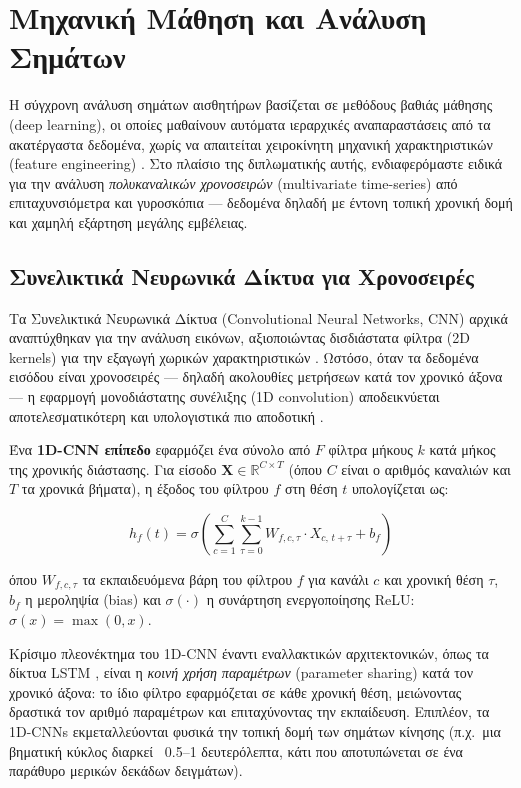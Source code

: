 
\section{Μηχανική Μάθηση και Ανάλυση Σημάτων}
\label{sec:ml_signals}

Η σύγχρονη ανάλυση σημάτων αισθητήρων βασίζεται σε μεθόδους βαθιάς μάθησης
(deep learning), οι οποίες μαθαίνουν αυτόματα ιεραρχικές αναπαραστάσεις
από τα ακατέργαστα δεδομένα, χωρίς να απαιτείται χειροκίνητη μηχανική
χαρακτηριστικών (feature engineering) \cite{Goodfellow2016}. Στο πλαίσιο
της διπλωματικής αυτής, ενδιαφερόμαστε ειδικά για την ανάλυση
\textit{πολυκαναλικών χρονοσειρών} (multivariate time-series) από
επιταχυνσιόμετρα και γυροσκόπια — δεδομένα δηλαδή με έντονη τοπική
χρονική δομή και χαμηλή εξάρτηση μεγάλης εμβέλειας.

\subsection{Συνελικτικά Νευρωνικά Δίκτυα για Χρονοσειρές}
\label{subsec:cnn_timeseries}

Τα Συνελικτικά Νευρωνικά Δίκτυα (Convolutional Neural Networks, CNN)
αρχικά αναπτύχθηκαν για την ανάλυση εικόνων, αξιοποιώντας δισδιάστατα
φίλτρα (2D kernels) για την εξαγωγή χωρικών χαρακτηριστικών \cite{He2016}.
Ωστόσο, όταν τα δεδομένα εισόδου είναι χρονοσειρές — δηλαδή ακολουθίες
μετρήσεων κατά τον χρονικό άξονα — η εφαρμογή μονοδιάστατης συνέλιξης
(1D convolution) αποδεικνύεται αποτελεσματικότερη και υπολογιστικά πιο
αποδοτική \cite{Chen2021}.

Ένα \textbf{1D-CNN επίπεδο} εφαρμόζει ένα σύνολο από $F$ φίλτρα μήκους
$k$ κατά μήκος της χρονικής διάστασης. Για είσοδο $\mathbf{X} \in
\mathbb{R}^{C \times T}$ (όπου $C$ είναι ο αριθμός καναλιών και $T$ τα
χρονικά βήματα), η έξοδος του φίλτρου $f$ στη θέση $t$ υπολογίζεται ως:

\begin{equation}
    \label{eq:conv1d}
    h_f(t) = \sigma\!\left(\sum_{c=1}^{C} \sum_{\tau=0}^{k-1}
    W_{f,c,\tau} \cdot X_{c,\, t+\tau} + b_f\right)
\end{equation}

\noindent όπου $W_{f,c,\tau}$ τα εκπαιδευόμενα βάρη του φίλτρου $f$
για κανάλι $c$ και χρονική θέση $\tau$, $b_f$ η μεροληψία (bias) και
$\sigma(\cdot)$ η συνάρτηση ενεργοποίησης ReLU: $\sigma(x) = \max(0, x)$.

Κρίσιμο πλεονέκτημα του 1D-CNN έναντι εναλλακτικών αρχιτεκτονικών,
όπως τα δίκτυα LSTM \cite{Hochreiter1997}, είναι η \textit{κοινή χρήση
παραμέτρων} (parameter sharing) κατά τον χρονικό άξονα: το ίδιο φίλτρο
εφαρμόζεται σε κάθε χρονική θέση, μειώνοντας δραστικά τον αριθμό
παραμέτρων και επιταχύνοντας την εκπαίδευση. Επιπλέον, τα 1D-CNNs
εκμεταλλεύονται φυσικά την τοπική δομή των σημάτων κίνησης (π.χ.\ μια
βηματική κύκλος διαρκεί ~0.5–1 δευτερόλεπτα, κάτι που αποτυπώνεται
σε ένα παράθυρο μερικών δεκάδων δειγμάτων).

